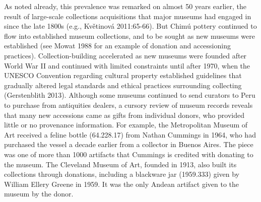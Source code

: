 \documentclass[]{interact}
\theoremstyle{plain}%
\theoremstyle{definition}
\theoremstyle{remark}
\begin{document}
As noted already, this prevalence was remarked on almost 50 years
earlier, the result of large-scale collections acquisitions that major
museums had engaged in since the late 1800s (e.g., Květinová
2011:65-66). But Chimú pottery continued to flow into established museum
collections, and to be sought as new museums were established (see Mowat
1988 for an example of donation and accessioning practices).
Collection-building accelerated as new museums were founded after World
War II and continued with limited constraints until after 1970, when the
UNESCO Convention regarding cultural property established guidelines
that gradually altered legal standards and ethical practices surrounding
collecting (Gerstenblith 2013). Although some museums continued to send
curators to Peru to purchase from antiquities dealers, a cursory review
of museum records reveals that many new accessions came as gifts from
individual donors, who provided little or no provenance information. For
example, the Metropolitan Museum of Art received a feline bottle
(64.228.17) from Nathan Cummings in 1964, who had purchased the vessel a
decade earlier from a collector in Buenos Aires. The piece was one of
more than 1000 artifacts that Cummings is credited with donating to the
museum. The Cleveland Museum of Art, founded in 1913, also built its
collections through donations, including a blackware jar (1959.333)
given by William Ellery Greene in 1959. It was the only Andean artifact
given to the museum by the donor.
\end{document}
